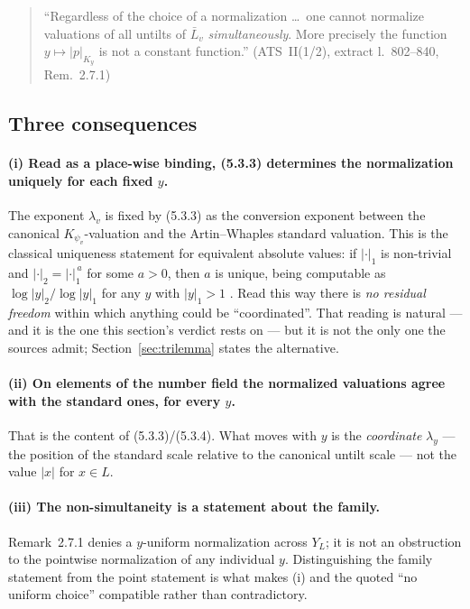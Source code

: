 \documentclass[11pt,a4paper]{article}
\theoremstyle{definition}
\theoremstyle{plain}
\theoremstyle{definition}
\newcommand{\Ynum}{Y_L}
\newcommand{\anchor}[2]{(#1, extract l.~#2)}
\begin{document}
\begin{quote}\small
``Regardless of the choice of a normalization \ldots\ one cannot normalize
valuations of all untilts of $\bar{L}_v$ \emph{simultaneously}. More precisely the
function $y \mapsto |p|_{K_y}$ is not a constant function.''
\hfill\anchor{ATS~II(1/2)}{802--840, Rem.~2.7.1}
\end{quote}

\subsection{Three consequences}

\paragraph{(i) Read as a place-wise binding, (5.3.3) determines the normalization
uniquely for each fixed $y$.}
The exponent $\lambda_v$ is fixed by (5.3.3) as the conversion exponent between
the canonical $K_{\psi_v}$-valuation and the Artin--Whaples standard valuation.
This is the classical uniqueness statement for equivalent absolute values: if
$|\cdot|_1$ is non-trivial and $|\cdot|_2 = |\cdot|_1^{\,a}$ for some $a > 0$,
then $a$ is unique, being computable as $\log|y|_2/\log|y|_1$ for any $y$ with
$|y|_1 > 1$ \cite[Prop.~7.8, p.~108]{Milne2020}. Read this way there is \emph{no
residual freedom} within which anything could be ``coordinated''. That reading is
natural --- and it is the one this section's verdict rests on --- but it is not
the only one the sources admit; Section~\ref{sec:trilemma} states the alternative.

\paragraph{(ii) On elements of the number field the normalized valuations agree
with the standard ones, for every $y$.}
That is the content of (5.3.3)/(5.3.4). What moves with $y$ is the
\emph{coordinate} $\lambda_y$ --- the position of the standard scale relative to
the canonical untilt scale --- not the value $|x|$ for $x \in L$.

\paragraph{(iii) The non-simultaneity is a statement about the family.}
Remark~2.7.1 denies a $y$-uniform normalization across $\Ynum$; it is not an
obstruction to the pointwise normalization of any individual $y$. Distinguishing
the family statement from the point statement is what makes (i) and the quoted
``no uniform choice'' compatible rather than contradictory.
\end{document}
